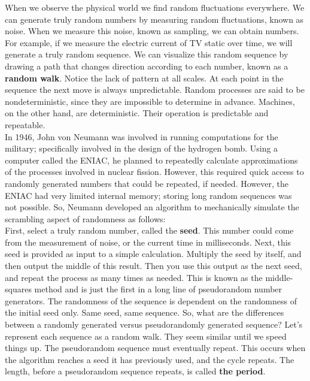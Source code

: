 \documentclass{report}
\begin{document}
When we observe the physical world we find random fluctuations everywhere. We can generate truly random numbers by measuring random fluctuations, known as noise. When we measure this noise, known as sampling, we can obtain numbers. For example, if we measure the electric current of TV static over time, we will generate a truly random sequence. We can visualize this random sequence by drawing a path that changes direction according to each number, known as a \textbf{random walk}.
Notice the lack of pattern at all scales. At each point in the sequence the next move is always unpredictable. Random processes are said to be nondeterministic, since they are impossible to determine in advance. Machines, on the other hand, are deterministic. Their operation is predictable and repeatable.\\
In 1946, John von Neumann was involved in running computations for the military; specifically involved in the design of the hydrogen bomb. Using a computer called the ENIAC, he planned to repeatedly calculate approximations of the processes involved in nuclear fission. However, this required quick access to randomly generated numbers that could be repeated, if needed. However, the ENIAC had very limited internal memory; storing long random sequences was not possible. So, Neumann developed an algorithm to mechanically simulate the scrambling aspect of randomness as follows:\\
First, select a truly random number, called the \textbf{seed}. This number could come from the measurement of noise, or the current time in milliseconds. Next, this seed is provided as input to a simple calculation. Multiply the seed by itself, and then output the middle of this result. Then you use this output as the next seed, and repeat the process as many times as needed. This is known as the middle-squares method and is just the first in a long line of pseudorandom number generators. The randomness of the sequence is dependent on the randomness of the initial seed only. Same seed, same sequence. So, what are the differences between a randomly generated versus pseudorandomly generated sequence? Let's represent each sequence as a random walk. They seem similar until we speed things up. The pseudorandom sequence must eventually repeat. This occurs when the algorithm reaches a seed it has previously used, and the cycle repeats. The length, before a pseudorandom sequence repeats, is called \textbf{the period}.\\
\end{document}
